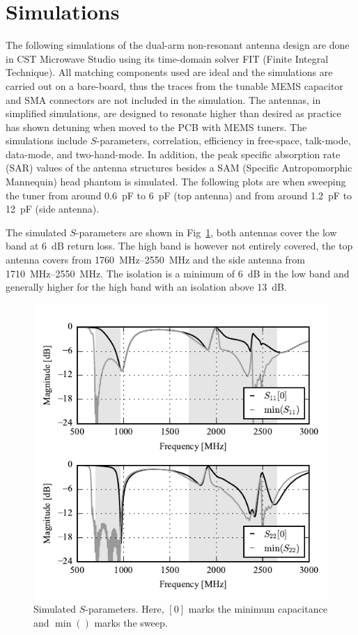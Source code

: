 \section{Simulations}
\label{sec:simulations}
The following simulations of the dual-arm non-resonant antenna design are done in CST Microwave Studio using its time-domain solver FIT (Finite Integral Technique). All matching components used are ideal and the simulations are carried out on a bare-board, thus the traces from the tunable MEMS capacitor and SMA connectors are not included in the simulation. 
The antennas, in simplified simulations, are designed to resonate higher than desired as practice has shown detuning when moved to the PCB with MEMS tuners.
The simulations include $S$-parameters, correlation, efficiency in free-space, talk-mode, data-mode, and two-hand-mode. In addition, the peak specific absorption rate (SAR) values of the antenna structures besides a SAM (Specific Antropomorphic Mannequin) head phantom is simulated. The following plots are when sweeping the tuner from around \SI{0.6}{pF} to \SI{6}{pF} (top antenna) and from around \SI{1.2}{pF} to \SI{12}{pF} (side antenna).


The simulated $S$-parameters are shown in Fig~\ref{fig:sim_sparams}, both antennas cover the low band at \SI{6}{dB} return loss. The high band is however not entirely covered, the top antenna covers from \SIrange{1760}{2550}{MHz} and the side antenna from \SIrange{1710}{2550}{MHz}. The isolation is a minimum of \SI{6}{dB} in the low band and generally higher for the high band with an isolation above \SI{13}{dB}. 
\begin{figure}[tb]
    \centering
    \includegraphics{img/sim/sparams/sparams}
    \caption{Simulated $S$-parameters. Here, $[0]$ marks the minimum capacitance and $\min()$ marks the sweep.}
    \label{fig:sim_sparams}
\end{figure}


